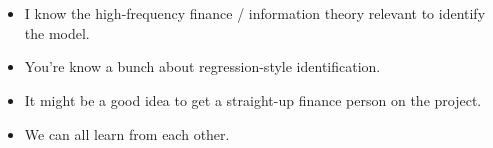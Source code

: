\documentclass[11pt]{article}
\begin{document}
\section{}

\begin{itemize}
    \item I know the high-frequency finance / information theory relevant to identify the model.
    \item You're know a bunch about regression-style identification.
    \item It might be a good idea to get a straight-up finance person on the project.
    \item We can all learn from each other.
\end{itemize}
\end{document}
